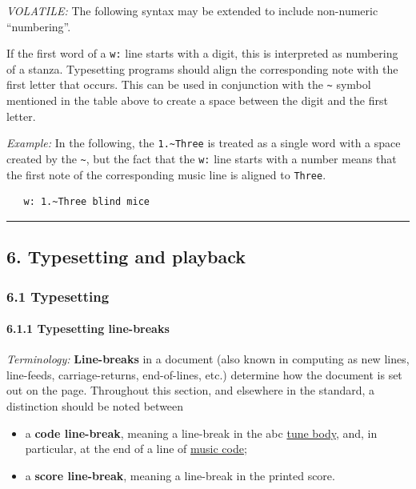 \documentclass[oneside]{book}
\let\oldparagraph\paragraph
\renewcommand{\paragraph}[1]{\oldparagraph{#1}\mbox{}}
\begin{document}
\emph{VOLATILE:} The following syntax may be extended to include
non-numeric ``numbering''.

If the first word of a \texttt{w:} line starts with a digit, this is
interpreted as numbering of a stanza. Typesetting programs should align
the corresponding note with the first letter that occurs. This can be
used in conjunction with the \texttt{\textasciitilde{}} symbol mentioned
in the table above to create a space between the digit and the first
letter.

\emph{Example:} In the following, the \texttt{1.\textasciitilde{}Three}
is treated as a single word with a space created by the
\texttt{\textasciitilde{}}, but the fact that the \texttt{w:} line
starts with a number means that the first note of the corresponding
music line is aligned to \texttt{Three}.

\begin{verbatim}
   w: 1.~Three blind mice
\end{verbatim}

\begin{center}\rule{0.5\linewidth}{\linethickness}\end{center}

\hypertarget{typesetting_and_playback}{\subsection{6. Typesetting and
playback}\label{typesetting_and_playback}}

\hypertarget{typesetting}{\subsubsection{6.1
Typesetting}\label{typesetting}}

\hypertarget{typesetting_line-breaks}{\paragraph{6.1.1 Typesetting
line-breaks}\label{typesetting_line-breaks}}

\emph{Terminology:} \textbf{Line-breaks} in a document (also known in
computing as new lines, line-feeds, carriage-returns, end-of-lines,
etc.) determine how the document is set out on the page. Throughout this
section, and elsewhere in the standard, a distinction should be noted
between

\begin{itemize}
\item
  \href{}{}a \textbf{code line-break}, meaning a line-break in the abc
  \protect\hyperlink{tune_body_definition}{tune body}, and, in
  particular, at the end of a line of
  \protect\hyperlink{music_code_definition}{music code};
\item
  \href{}{}a \textbf{score line-break}, meaning a line-break in the
  printed score.
\end{itemize}
\end{document}
